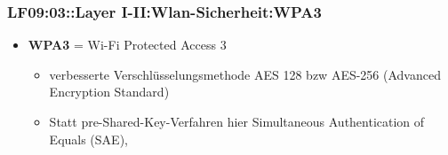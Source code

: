 \begin{frame}  
  \frametitle{LF09:03::Layer I-II:Wlan-Sicherheit:WPA3}

  
  \begin{itemize}
     \item \textbf{WPA3} = Wi-Fi Protected Access 3
    \begin{itemize}
      \item verbesserte Verschlüsselungsmethode AES 128 bzw AES-256 (Advanced Encryption Standard) 
      \item Statt pre-Shared-Key-Verfahren hier Simultaneous Authentication of Equals (SAE),
    \end{itemize}    
  \end{itemize}

\end{frame}